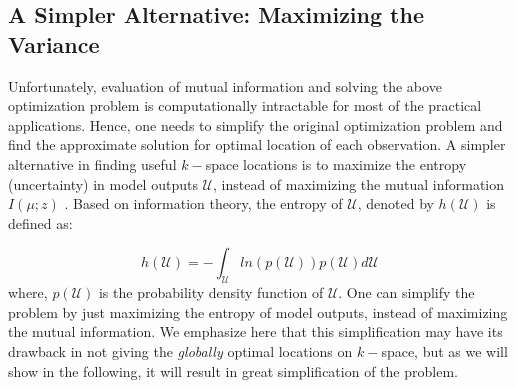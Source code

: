 \documentclass{article}         %
\theoremstyle{definition}
\theoremstyle{remark}
\begin{document}
\subsection{A Simpler Alternative: Maximizing the Variance}\label{susec:variance}
Unfortunately, evaluation of mutual information and solving the above optimization problem is computationally intractable for most of the practical applications. Hence, one needs to simplify the original optimization problem and find the approximate solution for optimal location of each observation. A simpler alternative in finding useful $k-$space locations is to maximize the entropy (uncertainty) in model outputs $\mathcal{U}$, instead of maximizing the mutual information $I(\mu;z)$ \cite{krause2008}. Based on information theory, the entropy of $\mathcal{U}$, denoted by $h(\mathcal{U})$ is defined as:
%

\begin{equation}\label{entropy}
h(\mathcal{U})=-\int_{\mathcal{U}} ln\left(p(\mathcal{U})\right)p(\mathcal{U})d\mathcal{U}
\end{equation}
where, $p(\mathcal{U})$ is the probability density function of $\mathcal{U}$. %
One can simplify the problem by just maximizing the entropy of model outputs, instead of maximizing the mutual information. We emphasize here that this simplification may have its drawback in not giving the \textit{globally} optimal locations on $k-$space, but as we will show in the following, it will result in great simplification of the problem. 
\end{document}

